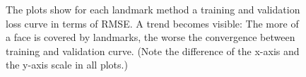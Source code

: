 \begin{figure}[htbp]
\begin{center}
  \hfill
  \caption[Ablation study: Landmark methods loss curves]{The plots show for each landmark method a training and validation loss curve in terms of RMSE. A trend becomes visible: The more of a face is covered by landmarks, the worse the convergence between training and validation curve. (Note the difference of the x-axis and the y-axis scale in all plots.)}
  \label{fig:LandmarksVisualComparison}
  \end{center}
\end{figure}

